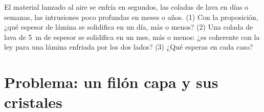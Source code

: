 \begin{exercise}[$\star\star\star$]\label{exo:g11:igneous-rocks:15}
El material lanzado al aire se enfría en segundos, las coladas de lava en días
o semanas, las intrusiones poco profundas en meses o años. (1) Con la
proposición, ¿qué espesor de lámina se solidifica en un día, más o menos?
(2) Una colada de lava de \qty{5}{m} de espesor se solidifica en un mes, más o
menos: ¿es coherente con la ley para una lámina enfriada por los dos lados?
(3) ¿Qué  esperas en cada caso?
\end{exercise}

\section{Problema: un filón capa y sus cristales}

